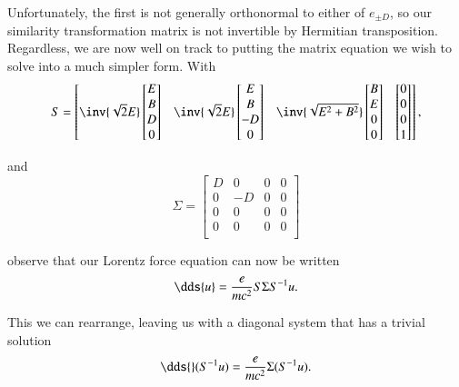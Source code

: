 {Unfortunately, the first is not generally orthonormal to either of \(e_{\pm D}\), so our similarity transformation matrix is not invertible by Hermitian transposition.  Regardless, we are now well on track to putting the matrix equation we wish to solve into a much simpler form.  With
%
\begin{equation}\label{eqn:relElectroDynProblemSet2:710}
S =
\begin{bmatrix}
\inv{\sqrt{2}E}
\begin{bmatrix}
E \\
B \\
D \\
0
\end{bmatrix}
&
\inv{\sqrt{2}E}
\begin{bmatrix}
E \\
B \\
-D \\
0
\end{bmatrix} &
\inv{\sqrt{E^2 + B^2}}
\begin{bmatrix}
B \\
E \\
0 \\
0
\end{bmatrix} &
\begin{bmatrix}
0 \\
0 \\
0 \\
1
\end{bmatrix}
\end{bmatrix},
\end{equation}

and
%
\begin{equation}\label{eqn:relElectroDynProblemSet2:730}
\Sigma =
\begin{bmatrix}
D & 0 & 0 & 0 \\
0 & -D & 0 & 0 \\
0 & 0 & 0 & 0 \\
0 & 0 & 0 & 0 \\
\end{bmatrix}
\end{equation}

observe that our Lorentz force equation can now be written
%
\begin{equation}\label{eqn:relElectroDynProblemSet2:750}
\dds{u} = \frac{e}{m c^2} S \Sigma S^{-1} u.
\end{equation}

This we can rearrange, leaving us with a diagonal system that has a trivial solution
%
\begin{equation}\label{eqn:relElectroDynProblemSet2:770}
\dds{} (S^{-1} u) = \frac{e}{m c^2} \Sigma (S^{-1} u).
\end{equation}

}
